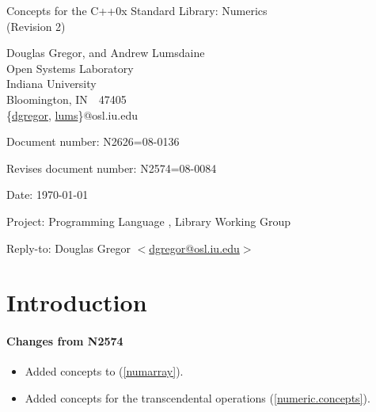 \documentclass[american,twoside]{book}
\begin{document}
\raggedbottom

\begin{titlepage}
\begin{center}
\huge
Concepts for the C++0x Standard Library: Numerics\\
(Revision 2)

\vspace{0.5in}

\normalsize
Douglas Gregor, and Andrew Lumsdaine \\
Open Systems Laboratory \\
Indiana University \\
Bloomington, IN\ \  47405 \\
\{\href{mailto:dgregor@osl.iu.edu}{dgregor}, \href{mailto:lums@osl.iu.edu}{lums}\}@osl.iu.edu
\end{center}

\vspace{1in}
\par\noindent Document number: N2626=08-0136\vspace{-6pt}
\par\noindent Revises document number: N2574=08-0084\vspace{-6pt}
\par\noindent Date: \today\vspace{-6pt}
\par\noindent Project: Programming Language \Cpp{}, Library Working Group\vspace{-6pt}
\par\noindent Reply-to: Douglas Gregor $<$\href{mailto:dgregor@osl.iu.edu}{dgregor@osl.iu.edu}$>$\vspace{-6pt}

\section*{Introduction}

\paragraph*{Changes from N2574}
\begin{itemize}
\item Added concepts to  (\ref{numarray}).
\item Added concepts for the transcendental operations (\ref{numeric.concepts}).
\end{itemize}

\end{titlepage}
\end{document}
